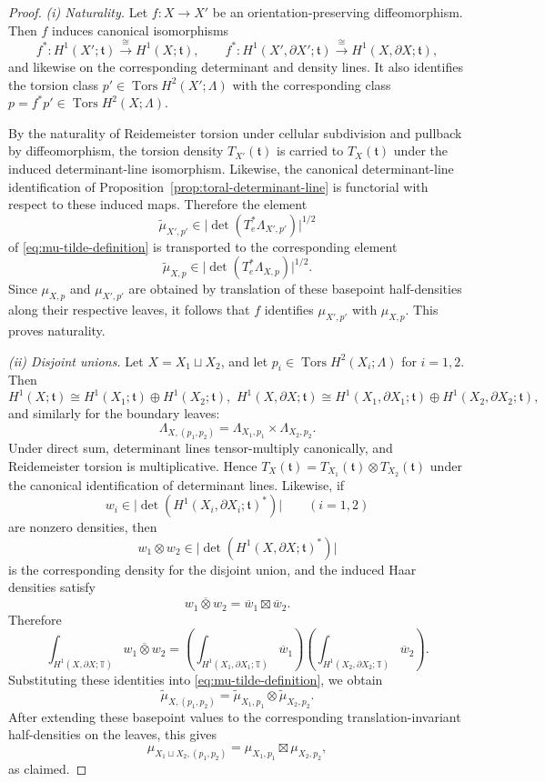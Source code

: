 \documentclass[12pt]{amsart}
\numberwithin{equation}{section}
\begin{document}
\begin{proof}
\noindent
\emph{(i) Naturality.}
Let $f\colon X\to X'$ be an orientation-preserving diffeomorphism. Then $f$ induces canonical
isomorphisms
\[
f^*\colon H^1(X';\mathfrak t)\xrightarrow{\ \cong\ } H^1(X;\mathfrak t),
\qquad
f^*\colon H^1(X',\partial X';\mathfrak t)\xrightarrow{\ \cong\ } H^1(X,\partial X;\mathfrak t),
\]
and likewise on the corresponding determinant and density lines. It also identifies the torsion class
$p'\in \operatorname{Tors}H^2(X';\Lambda)$ with the corresponding class
$p=f^*p'\in \operatorname{Tors}H^2(X;\Lambda)$.

By the naturality of Reidemeister torsion under cellular subdivision and pullback by diffeomorphism, the
torsion density $T_{X'}(\mathfrak t)$ is carried to $T_X(\mathfrak t)$ under the induced determinant-line
isomorphism. Likewise, the canonical determinant-line identification of
Proposition~\ref{prop:toral-determinant-line} is functorial with respect to these induced maps. Therefore
the element
\[
\widetilde{\mu}_{X',p'}
\in \bigl|\det(T_e^*\Lambda_{X',p'})\bigr|^{1/2}
\]
of \eqref{eq:mu-tilde-definition} is transported to the corresponding element
\[
\widetilde{\mu}_{X,p}
\in \bigl|\det(T_e^*\Lambda_{X,p})\bigr|^{1/2}.
\]
Since $\mu_{X,p}$ and $\mu_{X',p'}$ are obtained by translation of these basepoint half-densities along
their respective leaves, it follows that $f$ identifies $\mu_{X',p'}$ with $\mu_{X,p}$. This proves
naturality.

\smallskip
\noindent
\emph{(ii) Disjoint unions.}
Let $X=X_1\sqcup X_2$, and let $p_i\in \operatorname{Tors}H^2(X_i;\Lambda)$ for $i=1,2$. Then
\[
H^1(X;\mathfrak t)\cong H^1(X_1;\mathfrak t)\oplus H^1(X_2;\mathfrak t),\,\,
H^1(X,\partial X;\mathfrak t)\cong
H^1(X_1,\partial X_1;\mathfrak t)\oplus H^1(X_2,\partial X_2;\mathfrak t),
\]
and similarly for the boundary leaves:
\[
\Lambda_{X,(p_1,p_2)}
=
\Lambda_{X_1,p_1}\times \Lambda_{X_2,p_2}.
\]
Under direct sum, determinant lines tensor-multiply canonically, and Reidemeister torsion is multiplicative.
Hence $T_X(\mathfrak t) = T_{X_1}(\mathfrak t)\otimes T_{X_2}(\mathfrak t)$
under the canonical identification of determinant lines. Likewise, if
\[
w_i\in \bigl|\det(H^1(X_i,\partial X_i;\mathfrak t)^*)\bigr|
\qquad (i=1,2)
\]
are nonzero densities, then
\[
w_1\otimes w_2
\in
\bigl|\det(H^1(X,\partial X;\mathfrak t)^*)\bigr|
\]
is the corresponding density for the disjoint union, and the induced Haar densities satisfy
\[
\overline{w_1\otimes w_2}
=
\overline{w}_1\boxtimes \overline{w}_2.
\]
Therefore
\[
\int_{H^1(X,\partial X;\mathbb T)} \overline{w_1\otimes w_2}
=
\left(\int_{H^1(X_1,\partial X_1;\mathbb T)} \overline{w}_1\right)
\left(\int_{H^1(X_2,\partial X_2;\mathbb T)} \overline{w}_2\right).
\]
Substituting these identities into \eqref{eq:mu-tilde-definition}, we obtain
\[
\widetilde{\mu}_{X,(p_1,p_2)}
=
\widetilde{\mu}_{X_1,p_1}\otimes \widetilde{\mu}_{X_2,p_2}.
\]
After extending these basepoint values to the corresponding translation-invariant half-densities on the leaves, this gives
\[
\mu_{X_1\sqcup X_2,(p_1,p_2)}
=
\mu_{X_1,p_1}\boxtimes \mu_{X_2,p_2},
\]
as claimed.


\end{proof}
\end{document}
